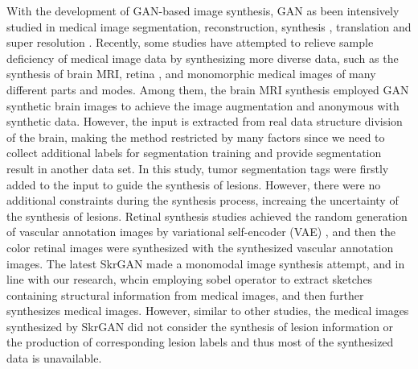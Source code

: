 \documentclass[runningheads]{llncs}
\begin{document}
	With the development of GAN-based image synthesis, GAN as been intensively studied in medical image segmentation\cite{40kamnitsas2017unsupervised}, reconstruction\cite{61fan2018a,65anirudh2018lose}, synthesis \cite{41costa2017towards,4shin2018medical,43iglesias2013is,44shrivastava2017learning}, translation \cite{2zhang2018translating,20nie2017medical,35osokin2017gans,36vannguyen2015crossdomain,40kamnitsas2017unsupervised,136yi2018sharpness-aware,137yang2018low-dose,138WolterinkGenerative} and super resolution \cite{14You2018CT,15lyu2018super-resolution}. 
	Recently, some studies have attempted to relieve sample deficiency of medical image data by synthesizing more diverse data, such as the synthesis of brain MRI\cite{4shin2018medical},  retina \cite{41costa2017towards}, and  monomorphic medical images of many different parts and modes\cite{96zhang2019skrgan:}. Among them, the brain MRI synthesis \cite{4shin2018medical} employed GAN synthetic brain images to achieve the  image augmentation and anonymous with synthetic data. However, the input is extracted from real data structure division of the brain, making the method restricted by many factors since we need to collect additional labels for segmentation training and provide segmentation result in another data set.  In this study, tumor segmentation tags were firstly added to the input  to guide the synthesis of lesions. However, there were no additional constraints during the synthesis process, increaing the uncertainty of the synthesis of lesions. Retinal synthesis studies\cite{41costa2017towards} achieved the random generation of vascular annotation images by variational self-encoder (VAE) \cite{87kingma2014auto-encoding,88rezende2014stochastic}, and then the color retinal images were synthesized with the synthesized vascular annotation images. The latest SkrGAN\cite{96zhang2019skrgan:} made a monomodal image synthesis attempt, and in line with our research, whcin employing sobel operator to extract sketches containing structural information from medical images, and then further synthesizes medical images. However, similar to other studies, the medical images synthesized by SkrGAN did not consider the synthesis of lesion information or the production of corresponding lesion labels and thus most of the synthesized data is unavailable.
	
\end{document}

